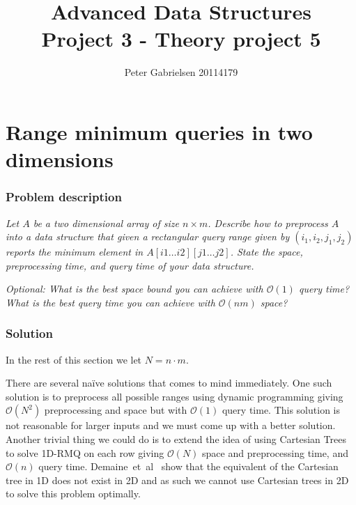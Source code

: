 \documentclass[a4paper,oneside,article,11pt]{memoir}
\title{Advanced Data Structures \\ Project 3 - Theory project 5}
\author{Peter Gabrielsen 20114179}
\begin{document}
\begin{titlingpage}
\clearpage

\maketitle
\thispagestyle{empty}

\begin{abstract}

\end{abstract}
\end{titlingpage}

\pagebreak

\tableofcontents

\pagebreak

\chapter{Range minimum queries in two dimensions}
\label{chp:rmq2d}
\subsection{Problem description}
\textit{Let $A$ be a two dimensional array of size $n \times m$. Describe how to preprocess $A$ into a data structure that given a rectangular query range given by $(i_1,i_2,j_1,j_2)$ reports the minimum element in $A\left[ i1\dots i2\right]\left[j1\dots j2\right]$. State the space, preprocessing time, and query time of your data structure.}

\textit{Optional: What is the best space bound you can achieve with $\mathcal{O}(1)$ query time? What is the best query time you can achieve with $\mathcal{O}(nm)$ space?}

\subsection{Solution}
In the rest of this section we let $N = n\cdot m$.

There are several naïve solutions that comes to mind immediately. One such solution is to preprocess all possible ranges using dynamic programming giving $\mathcal{O}(N^2)$ preprocessing and space but with $\mathcal{O}(1)$ query time.
This solution is not reasonable for larger inputs and we must come up with a better solution. Another trivial thing we could do is to extend the idea of using Cartesian Trees\cite{vuillemin80,tarjan84} to solve 1D-RMQ on each row giving $\mathcal{O}(N)$ space and preprocessing time, and $\mathcal{O}(n)$ query time. Demaine~et~al~\cite{demaine09} show that the equivalent of the Cartesian tree in 1D does not exist in 2D and as such we cannot use Cartesian trees in 2D to solve this problem optimally.
\end{document}
